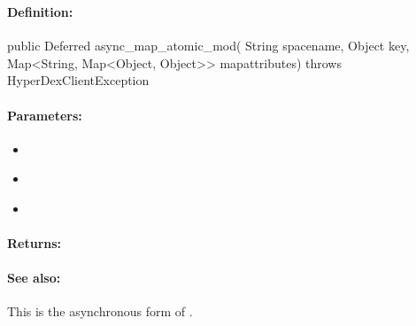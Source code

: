 \pagebreak
\subsubsection{}
\label{api:java:async_map_atomic_mod}


\paragraph{Definition:}
\begin{javacode}
public Deferred async_map_atomic_mod(
        String spacename,
        Object key,
        Map<String, Map<Object, Object>> mapattributes) throws HyperDexClientException
\end{javacode}

\paragraph{Parameters:}
\begin{itemize}[noitemsep]
\item {}\\

\item {}\\

\item {}\\

\end{itemize}

\paragraph{Returns:}


\paragraph{See also:}  This is the asynchronous form of .

\pagebreak
\subsubsection{}
\label{api:java:cond_map_atomic_mod}



